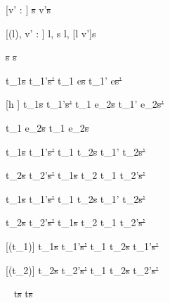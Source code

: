 [v' : \beta]
  { }
  {\Fill \beta\st{s}  \Edit v'\st{s}}

[\Sigma(l), v' : \beta]
  { }
  {\Store l, s  \Store l, [l \mapsto v']s}


  { }
  {\Fail\st{s}  \Fail\st{s}}


  {t_1\st{s}  t_1'\st{s'}}
  {t_1 \Then e\st{s}  t_1' \Then e\st{s'}}

[h \neq \Continue]
  {t_1\st{s}  t_1'\st{s'}}
  {t_1 \Next e_2\st{s}  t_1' \Next e_2\st{s'}}

  { }
  {t_1 \Next e_2\st{s} \handle{\Continue} t_1 \Then e_2\st{s}}


  {t_1\st{s}  t_1'\st{s'} }
  {t_1 \And t_2\st{s}  t_1' \And t_2\st{s'}}

  {t_2\st{s}  t_2'\st{s'} }
  {t_1\st{s} \And t_2  t_1 \And t_2'\st{s'}}


  {t_1\st{s}  t_1'\st{s'} }
  {t_1 \Or t_2\st{s}  t_1' \Or t_2\st{s'}}

  {t_2\st{s}  t_2'\st{s'} }
  {t_1\st{s} \Or t_2  t_1 \Or t_2'\st{s'}}


[\Succeeding(t_1)]
  {t_1\st{s}  t_1'\st{s'}}
  {t_1 \Xor t_2\st{s}  t_1'\st{s'}}

[\Succeeding(t_2)]
  {t_2\st{s}  t_2'\st{s'}}
  {t_1 \Xor t_2\st{s}  t_2'\st{s'}}

  {\ }
  {t\st{s} \handle{\Pick \Here} t\st{s}}









